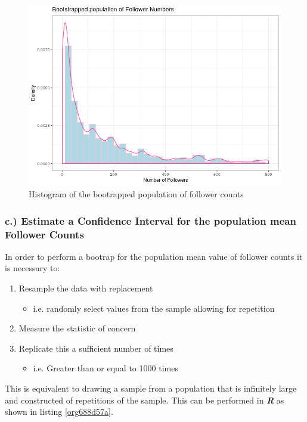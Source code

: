 \documentclass[11pt]{article}
\begin{document}
\begin{figure}[htbp]
\centering
\includegraphics[width=12cm]{./Figures/BootStrap_Pop.png}
\caption{\label{fig:orgd44fbaa}Histogram of the bootrapped population of follower counts}
\end{figure}

\subsubsection{c.) Estimate a Confidence Interval for the population mean Follower Counts}
\label{sec:org39106fd}
In order to perform a bootrap for the population mean value of follower counts it is necessary to:

\begin{enumerate}
\item Resample the data with replacement
\begin{itemize}
\item i.e. randomly select values from the sample allowing for repetition
\end{itemize}
\item Measure the statistic of concern
\item Replicate this a sufficient number of times
\begin{itemize}
\item i.e. Greater than or equal to 1000 times \cite[Ch. 5]{davison1997}
\end{itemize}
\end{enumerate}

This is equivalent to drawing a sample from a population that is infinitely large and constructed of repetitions of the sample. This can be performed in \textbf{\emph{R}} as shown in listing \ref{org688d57a}.
\end{document}
